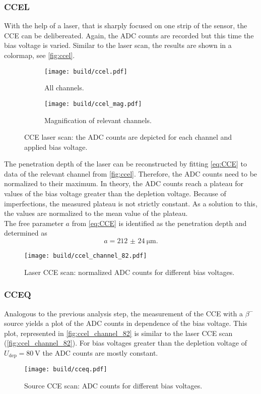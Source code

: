 \subsubsection{CCEL}
With the help of a laser, that is sharply focused on one strip of the sensor, the CCE can be delibereated. Again, the ADC counts are recorded but this time the
bias voltage is varied. Similar to the laser scan, the results are shown in a colormap, see \autoref{fig:ccel}.
\begin{figure}
    \centering
    \begin{subfigure}{0.49\textwidth}
        \texttt{[image: build/ccel.pdf]}
        \caption{All channels.}
        \label{fig:ccel_all_channels}
    \end{subfigure}
    \hfill
    \begin{subfigure}{0.49\textwidth}
        \texttt{[image: build/ccel\_mag.pdf]}
        \caption{Magnification of relevant channels.}
        \label{fig:ccel_mag}
    \end{subfigure}
    \caption{CCE laser scan: the ADC counts are depicted for each channel and applied bias voltage.}
    \label{fig:ccel}
\end{figure}

The penetration depth of the laser can be reconstructed by fitting \autoref{eq:CCE} to data of the relevant channel from \autoref{fig:ccel}.
Therefore, the ADC counts need to be normalized to their maximum. In theory, the ADC counts reach a plateau for values of the bias voltage greater 
than the depletion voltage. Because of imperfections, the measured plateau is not strictly constant. As a solution to this, the values are normalized to the
mean value of the plateau. \\
The free parameter $a$ from \autoref{eq:CCE} is identified as the penetration depth and determined as
\begin{equation*}
    a = \qty{212(24)}{\micro\metre}.
\end{equation*}

\begin{figure}
    \centering
    \texttt{[image: build/ccel\_channel\_82.pdf]}
    \caption{Laser CCE scan: normalized ADC counts for different bias voltages.}
    \label{fig:ccel_channel_82}
\end{figure}

\subsubsection{CCEQ}
Analogous to the previous analysis step, the measurement of the CCE with a $\beta^-$ source yields a plot of the ADC counts in dependence of the bias voltage.
This plot, represented in \autoref{fig:ccel_channel_82} is similar to the laser CCE scan (\autoref{fig:ccel_channel_82}). For bias voltages greater than
the depletion voltage of $U_\mathrm{dep} = \qty{80}{\volt}$ the ADC counts are mostly constant.
\begin{figure}
    \centering
    \texttt{[image: build/cceq.pdf]}
    \caption{Source CCE scan: ADC counts for different bias voltages.}
    \label{fig:cceq}
\end{figure}

